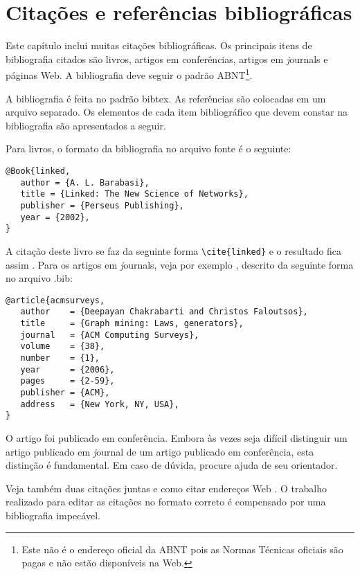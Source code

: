 %
%

\chapter{Citações e referências bibliográficas}

Este capítulo inclui muitas citações bibliográficas. Os principais
itens de bibliografia citados são livros, artigos em conferências,
artigos em {\textit journals} e páginas Web. A bibliografia deve seguir o
padrão ABNT\footnote{Este não é o endereço oficial da
ABNT pois as Normas Técnicas oficiais são pagas e não estão disponíveis na Web.}.

A bibliografia é feita no padrão {\ttfamily bibtex}.
As referências são colocadas em um arquivo separado.
Os elementos de cada item bibliográfico que devem constar na bibliografia são apresentados a seguir.

Para livros, o formato da bibliografia no arquivo fonte é o seguinte:

\begin{verbatim}
@Book{linked,
   author = {A. L. Barabasi},
   title = {Linked: The New Science of Networks},
   publisher = {Perseus Publishing},
   year = {2002},
}
\end{verbatim}

A citação deste livro se faz da seguinte forma \verb#\cite{linked}# e o resultado fica assim \cite{linked}.
Para os artigos em {\textit journals}, veja por exemplo \cite{acmsurveys},
descrito da seguinte forma no arquivo {\ttfamily .bib}:

\begin{verbatim}
@article{acmsurveys,
   author    = {Deepayan Chakrabarti and Christos Faloutsos},
   title     = {Graph mining: Laws, generators},
   journal   = {ACM Computing Surveys},
   volume    = {38},
   number    = {1},
   year      = {2006},
   pages     = {2-59},
   publisher = {ACM},
   address   = {New York, NY, USA},
}
\end{verbatim}

O artigo \cite{3faloutsos} foi publicado em conferência. Embora
às vezes seja difícil distinguir um artigo publicado em {\textit
 journal} de um artigo publicado em conferência, esta distinção é
fundamental. Em caso de dúvida, procure ajuda de seu orientador.

Veja também duas citações juntas \cite{rp99,mar00} e como citar
endereços Web \cite{irl:06}.
O trabalho realizado para editar as citações no formato correto é
compensado por uma bibliografia impecável.

